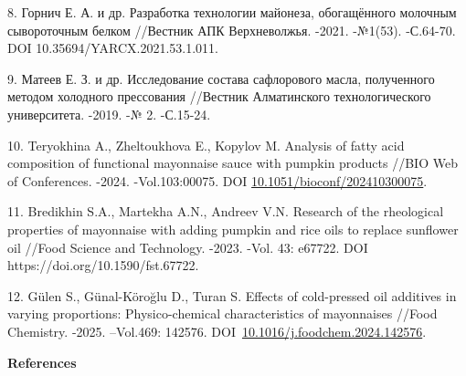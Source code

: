 \begin{refs}
8. Горнич Е. А. и др. Разработка технологии майонеза, обогащённого
молочным сывороточным белком //Вестник АПК Верхневолжья. -2021.
-№1(53). -С.64-70. DOI 10.35694/YARCX.2021.53.1.011.

9. Матеев Е. З. и др. Исследование состава сафлорового масла, полученного
методом холодного прессования //Вестник Алматинского технологического
университета. -2019. -№ 2. -С.15-24.

10. Teryokhina A., Zheltoukhova E., Kopylov M. Analysis of fatty acid
composition of functional mayonnaise sauce with pumpkin products //BIO
Web of Conferences. -2024. -Vol.103:00075. DOI
\href{https://doi.org/10.1051/bioconf/202410300075}{10.1051/bioconf/202410300075}.

11. Bredikhin S.A., Martekha A.N., Andreev V.N. Research of the
rheological properties of mayonnaise with adding pumpkin and rice oils
to replace sunflower oil //Food Science and Technology. -2023. -Vol.
43: e67722. DOI https://doi.org/10.1590/fst.67722.

12. Gülen S., Günal-Köroğlu D., Turan S. Effects of cold-pressed oil
additives in varying proportions: Physico-chemical characteristics of
mayonnaises //Food Chemistry. -2025. --Vol.469: 142576.
DOI~\href{https://doi.org/10.1016/j.foodchem.2024.142576}{10.1016/j.foodchem.2024.142576}.
\end{refs}

\begin{center}
{\bfseries References}
\end{center}

